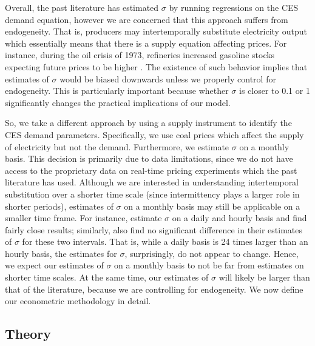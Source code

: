\documentclass[11pt,a4paper,leqno]{extarticle}
\begin{document}
	Overall, the past literature has estimated $\sigma$ by running regressions on the CES demand equation, however we are concerned that this approach suffers from endogeneity. That is, producers may intertemporally substitute electricity output which essentially means that there is a supply equation affecting prices. For instance, during the oil crisis of 1973, refineries increased gasoline stocks expecting future prices to be higher \citep{genie}. The existence of such behavior implies that estimates of $\sigma$ would be biased downwards unless we properly control for endogeneity. This is particularly important because whether $\sigma$ is closer to 0.1 or 1 significantly changes the practical implications of our model. 
	
	So, we take a different approach by using a supply instrument to identify the CES demand parameters. Specifically, we use coal prices which affect the supply of electricity but not the demand. Furthermore, we estimate $\sigma$ on a monthly basis. This decision is primarily due to data limitations, since we do  not have access to the proprietary data on real-time pricing experiments which the past literature has used. Although we are interested in understanding intertemporal substitution over a shorter time scale (since intermittency plays a larger role in shorter periods), estimates of $\sigma$ on a monthly basis may still be applicable on a smaller time frame. For instance, \citet{Schwarz} estimate $\sigma$ on a daily and hourly basis and find fairly close results; similarly, \citet{Herriges} also find no significant difference in their estimates of $\sigma$ for these two intervals. That is, while a daily basis is 24 times larger than an hourly basis, the estimates for $\sigma$, surprisingly, do not appear to change. Hence, we expect our estimates of $\sigma$ on a monthly basis to not be far from estimates on shorter time scales. At the same time, our estimates of $\sigma$ will likely be larger than that of the literature, because we are controlling for endogeneity. We now define our econometric methodology in detail.
	
	\subsection{Theory}
	
\end{document}
